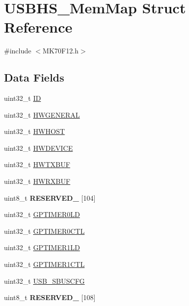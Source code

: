 \hypertarget{struct_u_s_b_h_s___mem_map}{}\section{U\+S\+B\+H\+S\+\_\+\+Mem\+Map Struct Reference}
\label{struct_u_s_b_h_s___mem_map}


{\ttfamily \#include $<$M\+K70\+F12.\+h$>$}

\subsection*{Data Fields}
\begin{DoxyCompactItemize}
\item 
uint32\+\_\+t \hyperlink{struct_u_s_b_h_s___mem_map_a3358adaf9078bf47a19ac176de27fb3d}{I\+D}
\item 
uint32\+\_\+t \hyperlink{struct_u_s_b_h_s___mem_map_abf62294144221450dac968fe1598f745}{H\+W\+G\+E\+N\+E\+R\+A\+L}
\item 
uint32\+\_\+t \hyperlink{struct_u_s_b_h_s___mem_map_a23b580e1655533bb112fd6e4d2a60e71}{H\+W\+H\+O\+S\+T}
\item 
uint32\+\_\+t \hyperlink{struct_u_s_b_h_s___mem_map_a107edcad73cd5c798c766e09940f3d7d}{H\+W\+D\+E\+V\+I\+C\+E}
\item 
uint32\+\_\+t \hyperlink{struct_u_s_b_h_s___mem_map_a2ea6ab8550283d6c27c79416fd767954}{H\+W\+T\+X\+B\+U\+F}
\item 
uint32\+\_\+t \hyperlink{struct_u_s_b_h_s___mem_map_a6d3e0350ab617222d58e51b9748a25df}{H\+W\+R\+X\+B\+U\+F}
\item 
\hypertarget{struct_u_s_b_h_s___mem_map_aac3ba0b77e0d2aa35b3505a67828ce4d}{}uint8\+\_\+t {\bfseries R\+E\+S\+E\+R\+V\+E\+D\+\_} \mbox{[}104\mbox{]}\label{struct_u_s_b_h_s___mem_map_aac3ba0b77e0d2aa35b3505a67828ce4d}

\item 
uint32\+\_\+t \hyperlink{struct_u_s_b_h_s___mem_map_a163a112733db4f36b2efceb85179a846}{G\+P\+T\+I\+M\+E\+R0\+L\+D}
\item 
uint32\+\_\+t \hyperlink{struct_u_s_b_h_s___mem_map_a60b5ac2618429761b81716b5839c960a}{G\+P\+T\+I\+M\+E\+R0\+C\+T\+L}
\item 
uint32\+\_\+t \hyperlink{struct_u_s_b_h_s___mem_map_a1243aa3b80b401c703ae05fb205957e2}{G\+P\+T\+I\+M\+E\+R1\+L\+D}
\item 
uint32\+\_\+t \hyperlink{struct_u_s_b_h_s___mem_map_a53cb9dae742446a00ef3a3024f8274bb}{G\+P\+T\+I\+M\+E\+R1\+C\+T\+L}
\item 
uint32\+\_\+t \hyperlink{struct_u_s_b_h_s___mem_map_a17e03138a07af56c6f742f0140fff491}{U\+S\+B\+\_\+\+S\+B\+U\+S\+C\+F\+G}
\item 
\hypertarget{struct_u_s_b_h_s___mem_map_ac441d48add397014fe4d460822904057}{}uint8\+\_\+t {\bfseries R\+E\+S\+E\+R\+V\+E\+D\+\_} \mbox{[}108\mbox{]}\label{struct_u_s_b_h_s___mem_map_ac441d48add397014fe4d460822904057}


\end{DoxyCompactItemize}
